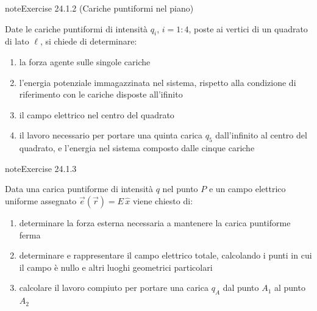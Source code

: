 \documentclass[letterpaper,10pt,italian]{jupyterBook}
\begin{document}
\begin{sphinxadmonition}{note}{Exercise 24.1.2 (Cariche puntiformi nel piano)}



\sphinxAtStartPar
Date le cariche puntiformi di intensità \(q_i\), \(i=1:4\), poste ai vertici di un quadrato di lato \(\ell\), si chiede di determinare:
\begin{enumerate}
%
\item {} 
\sphinxAtStartPar
la forza agente sulle singole cariche

\item {} 
\sphinxAtStartPar
l’energia potenziale immagazzinata nel sistema, rispetto alla condizione di riferimento con le cariche disposte all’ifinito

\item {} 
\sphinxAtStartPar
il campo elettrico nel centro del quadrato

\item {} 
\sphinxAtStartPar
il lavoro necessario per portare una quinta carica \(q_5\) dall’infinito al centro del quadrato, e l’energia nel sistema composto dalle cinque cariche

\end{enumerate}
\end{sphinxadmonition}
 \label{exercise:ch/electromagnetism/electrostatics-problems-exercise-2}

\begin{sphinxadmonition}{note}{Exercise 24.1.3}



\sphinxAtStartPar
Data una carica puntiforme di intensità \(q\) nel punto \(P\) e un campo elettrico uniforme assegnato \(\vec{e}(\vec{r}) = E \, \hat{x}\) viene chiesto di:
\begin{enumerate}
%
\item {} 
\sphinxAtStartPar
determinare la forza esterna necessaria a mantenere la carica puntiforme ferma

\item {} 
\sphinxAtStartPar
determinare e rappresentare il campo elettrico totale, calcolando i punti in cui il campo è nullo e altri luoghi geometrici particolari

\item {} 
\sphinxAtStartPar
calcolare il lavoro compiuto per portare una carica \(q_A\) dal punto \(A_1\) al punto \(A_2\)

\end{enumerate}
\end{sphinxadmonition}
 \label{exercise:ch/electromagnetism/electrostatics-problems-exercise-3}
\end{document}
